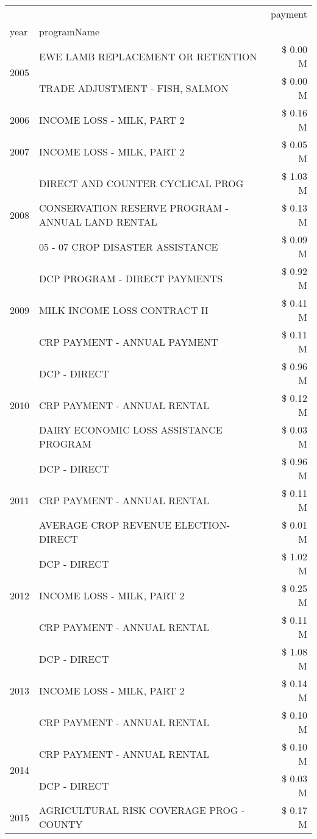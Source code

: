 \begin{tabular}{llr}
\toprule
 &  & payment \\
year & programName &  \\
\midrule
\multirow[t]{2}{*}{2005} & EWE LAMB REPLACEMENT OR RETENTION & \$ 0.00 M \\
 & TRADE ADJUSTMENT - FISH, SALMON & \$ 0.00 M \\
\cline{1-3}
2006 & INCOME LOSS - MILK, PART 2 & \$ 0.16 M \\
\cline{1-3}
2007 & INCOME LOSS - MILK, PART 2 & \$ 0.05 M \\
\cline{1-3}
\multirow[t]{3}{*}{2008} & DIRECT AND COUNTER CYCLICAL PROG & \$ 1.03 M \\
 & CONSERVATION RESERVE PROGRAM - ANNUAL LAND RENTAL & \$ 0.13 M \\
 & 05 - 07 CROP DISASTER ASSISTANCE & \$ 0.09 M \\
\cline{1-3}
\multirow[t]{3}{*}{2009} & DCP PROGRAM - DIRECT PAYMENTS & \$ 0.92 M \\
 & MILK INCOME LOSS CONTRACT II & \$ 0.41 M \\
 & CRP PAYMENT - ANNUAL PAYMENT & \$ 0.11 M \\
\cline{1-3}
\multirow[t]{3}{*}{2010} & DCP - DIRECT & \$ 0.96 M \\
 & CRP PAYMENT - ANNUAL RENTAL & \$ 0.12 M \\
 & DAIRY ECONOMIC LOSS ASSISTANCE PROGRAM & \$ 0.03 M \\
\cline{1-3}
\multirow[t]{3}{*}{2011} & DCP - DIRECT & \$ 0.96 M \\
 & CRP PAYMENT - ANNUAL RENTAL & \$ 0.11 M \\
 & AVERAGE CROP REVENUE ELECTION-DIRECT & \$ 0.01 M \\
\cline{1-3}
\multirow[t]{3}{*}{2012} & DCP - DIRECT & \$ 1.02 M \\
 & INCOME LOSS - MILK, PART 2 & \$ 0.25 M \\
 & CRP PAYMENT - ANNUAL RENTAL & \$ 0.11 M \\
\cline{1-3}
\multirow[t]{3}{*}{2013} & DCP - DIRECT & \$ 1.08 M \\
 & INCOME LOSS - MILK, PART 2 & \$ 0.14 M \\
 & CRP PAYMENT - ANNUAL RENTAL & \$ 0.10 M \\
\cline{1-3}
\multirow[t]{2}{*}{2014} & CRP PAYMENT - ANNUAL RENTAL & \$ 0.10 M \\
 & DCP - DIRECT & \$ 0.03 M \\
\cline{1-3}
\multirow[t]{2}{*}{2015} & AGRICULTURAL RISK COVERAGE PROG - COUNTY & \$ 0.17 M \\

\end{tabular}

